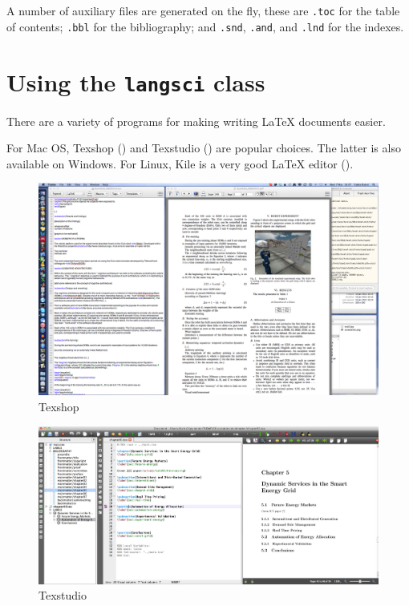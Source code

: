 A number of auxiliary files are generated on the fly, these are  \verb+.toc+ for the table of contents; \verb+.bbl+ for the bibliography; and \verb+.snd+, \verb+.and+, and \verb+.lnd+ for the indexes.

\section{Using the \texttt{langsci} class}
There are a variety of programs for making writing \LaTeX\xspace documents easier.

For Mac OS, Texshop () and Texstudio () are popular choices. The latter is also available on Windows.
For Linux, Kile is a very good \LaTeX\xspace editor ().



\begin{figure}
\includegraphics[height=.4\textheight]{texshop.png}
\caption{Texshop}
\label{fig:latex:texshop}
\end{figure}

\begin{figure}
\includegraphics[width=\textwidth]{texstudio.jpg}
\caption{Texstudio}
\label{fig:latex:texstudio}
\end{figure}


